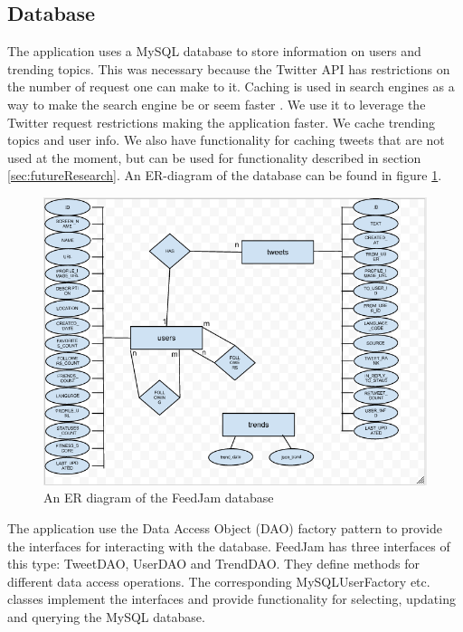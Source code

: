 \subsection{Database} %
\label{sec:feedJamDatabase}
The application uses a MySQL database to store information on users and trending topics. This was necessary because the Twitter API has restrictions on the number of request one can make to it. Caching is used in search engines as a way to make the search engine be or seem faster \citep{Baeza-Yates2011}. We use it to leverage the Twitter request restrictions making the application faster. We cache trending topics and user info. We also have functionality for caching tweets that are not used at the moment, but can be used for functionality described in  section \ref{sec:futureResearch}. An ER-diagram of the database can be found in figure \ref{fig:erDiagram}.

\begin{figure}[ht]
    \begin{minipage}[b]{1\linewidth}
        \centering
        \includegraphics[width=1\textwidth]{figures/erDiagram}
        \caption{An ER diagram of the FeedJam database}
        \label{fig:erDiagram}
    \end{minipage}
\end{figure}


The application use the Data Access Object (DAO) factory pattern to provide the interfaces for interacting with the database. FeedJam has three interfaces of this type: TweetDAO, UserDAO and TrendDAO. They define methods for different data access  operations. The corresponding MySQLUserFactory etc. classes implement the interfaces and provide functionality for selecting, updating and querying the MySQL database.

